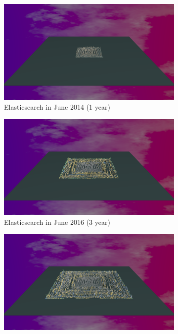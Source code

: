 \begin{figure}[h!]
    \begin{subfigure}{0.48\textwidth}
        \includegraphics[width=\linewidth]{Elasticsearch/Animation001.png}
        \caption{Elasticsearch in June 2014 (1 year)} 
        \label{fig:Elastic_V5_S1}
    \end{subfigure}\hspace*{\fill}
    \begin{subfigure}{0.48\textwidth}
        \includegraphics[width=\linewidth]{Elasticsearch/Animation003.png}
        \caption{Elasticsearch in June 2016 (3 year)} 
        \label{fig:Elastic_V5_S2}
    \end{subfigure}
    \medskip
    \begin{subfigure}{0.48\textwidth}
        \includegraphics[width=\linewidth]{Elasticsearch/Animation005.png}

\end{subfigure}
\end{figure}
